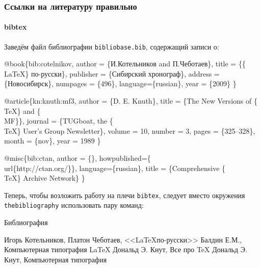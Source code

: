 \begin{frame}
    \frametitle{Ссылки на литературу правильно}
    \framesubtitle{bibtex}
    Заведём файл библиографии \verb"bibliobase.bib", содержащий записи о:
\begin{semiverbatim}  
@book\{bib:cotelnikov,
    author = \{И.Котельников and П.Чеботаев\},
    title = \{\{\\LaTeX\} по-русски\},
    publisher = \{Сибирский хронограф\},
    address = \{Новосибирск\},
    numpages = \{496\},
    language=\{russian\},
    year = \{2009\}
\}
\end{semiverbatim}  

\begin{semiverbatim}  
@article\{kn:knuth:mf3,
    author = \{D. E. Knuth\},
    title = \{The New Versions of \{\\TeX\} and \{\\MF\}\},
    journal = \{TUGboat, the \{\\TeX\} User's Group Newsletter\},
    volume = 10,
    number = 3,
    pages = \{325--328\},
    month = \{nov\},
    year = 1989
\} 
\end{semiverbatim}  

\begin{semiverbatim}  
@misc\{bib:ctan,
    author = \{\},
    howpublished=\{\\url\{http://ctan.org/\}\},
    language=\{russian\},
    title = \{Comprehensive \{\\TeX\} Archive Network\}
\}
\end{semiverbatim}  

Теперь, чтобы возложить работу на плечи \verb"bibtex", следует вместо окружения \verb"thebibliography" использовать пару команд:
\begin{semiverbatim}  
\\{<имя стиля оформления библиографии>\}
\\{<путь к файлу в формате bibtex>\}
\end{semiverbatim}  

\end{frame}


\appendix

\begin{frame}[allowframebreaks]{Библиография}
\begin{thebibliography}{99}
     Игорь Котельников, Платон Чеботаев, <<\LaTeX по-русски>>
     Балдин Е.М., Компьютерная типография \LaTeX
     Дональд Э. Кнут, Все про \TeX
     Дональд Э. Кнут, Компьютерная типография
\end{thebibliography}
\end{frame}



